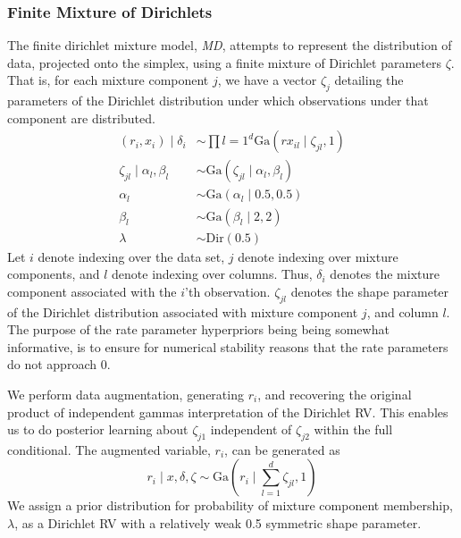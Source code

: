 \subsubsection{Finite Mixture of Dirichlets}
\label{model:md}
The finite dirichlet mixture model, \emph{MD}, attempts to represent the distribution of data, projected onto
  the simplex, using a finite mixture of Dirichlet parameters $\zeta$.  That is, for each mixture
  component $j$, we have a vector $\zeta_j$ detailing the parameters of the Dirichlet distribution
  under which observations under that component are distributed.
  \begin{equation}
    \label{eq:fmdirichlet}
    \begin{aligned}
      (r_i, x_i) \mid \delta_i &\sim \prod{l = 1}^d\text{Ga}(rx_{il}\mid \zeta_{jl}, 1)\\
            \zeta_{jl} \mid \alpha_l,\beta_l &\sim \text{Ga}(\zeta_{jl}\mid \alpha_l, \beta_l)\\
            \alpha_l &\sim \text{Ga}(\alpha_l \mid 0.5, 0.5)\\
            \beta_l &\sim \text{Ga}(\beta_l \mid 2, 2)\\
            \lambda &\sim \text{Dir}(0.5)
    \end{aligned}
  \end{equation}
  Let $i$ denote indexing over the data set, $j$ denote indexing over mixture components, and
  $l$ denote indexing over columns. Thus, $\delta_i$ denotes the mixture component associated
  with the $i$'th observation.  $\zeta_{jl}$ denotes the shape parameter of the Dirichlet
  distribution associated with mixture component $j$, and column $l$.  The purpose of the rate
  parameter hyperpriors being being somewhat informative, is to ensure for numerical stability
  reasons that the rate parameters do not approach 0.

We perform data augmentation, generating $r_i$, and recovering the original product of independent
  gammas interpretation of the Dirichlet RV.  This enables us to do posterior learning about
  $\zeta_{j1}$ independent of $\zeta_{j2}$ within the full conditional.  The augmented variable,
  $r_i$, can be generated as
  \begin{equation}
    \label{eq:L1augmentation}
    r_i\mid x, \delta, \zeta \sim \text{Ga}(r_i \mid \sum_{l = 1}^d \zeta_{jl}, 1)
  \end{equation}
  We assign a prior distribution for probability of mixture component membership, $\lambda$, as a
  Dirichlet RV with a relatively weak 0.5 symmetric shape parameter.

